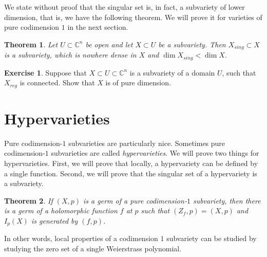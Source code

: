 \documentclass[12pt,openany]{book}
\newcommand{\C}{{\mathbb{C}}}
\theoremstyle{plain}
\newtheorem{thm}{Theorem}[section]
\theoremstyle{remark}
\theoremstyle{definition}
\newenvironment{exbox}{%
    \def\FrameCommand{\vrule width 1pt \relax\hspace{10pt}}%
    \MakeFramed{\advance\hsize-\width\FrameRestore}%
}{%
    \endMakeFramed
}
\theoremstyle{exercise}
\newtheorem{exercise}{Exercise}[section]
\theoremstyle{example}
\begin{document}
We state without proof that the singular set is, in fact, a
subvariety of lower dimension, that is, we have the following theorem.
We will prove it for varieties of pure codimension $1$
in the next section.

\begin{thm} \label{thm:varietysingularity}
Let $U \subset \C^n$ be open and let $X \subset U$
be a subvariety.
Then
$X_{\mathit{sing}} \subset X$ is a subvariety,
which is nowhere dense in $X$
and $\dim X_{\mathit{sing}} < \dim X$.
\end{thm}

\begin{exbox}
\begin{exercise}
Suppose that $X \subset U \subset \C^n$ is a subvariety
of a domain $U$, such that $X_{\mathit{reg}}$ is connected.  Show that $X$ is of
pure dimension.
\end{exercise}
\end{exbox}


\section{Hypervarieties} \label{section:hypervarieties}

Pure codimension-$1$ subvarieties are particularly nice.
Sometimes pure codimension-$1$ subvarieties are called
\emph{hypervarieties}.  We will prove two things for
hypervarieties.  First, we will prove that locally, a hypervariety can be
defined by a single function.
Second, we will prove that the singular set of a hypervariety is a
subvariety.

\begin{thm} \label{thm:codim1var}
\pagebreak[0]
If $(X,p)$ is a germ of a pure codimension-$1$ subvariety, then
there is a germ of a holomorphic function $f$ at $p$
such that $(Z_f,p) = (X,p)$ and $I_p(X)$ is generated by $(f,p)$.
\end{thm}

In other words, local properties of a codimension $1$ subvariety can be
studied by studying the zero set of a single Weierstrass polynomial.
\end{document}
